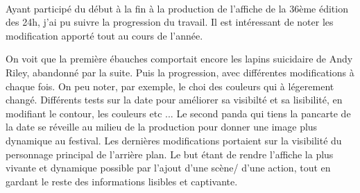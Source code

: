 \begin{center}
                \\
                Ayant participé du début à la fin à la production de l'affiche de la 36ème édition des 24h, j'ai pu suivre la progression du travail.
                Il est intéressant de noter les modification apporté tout au cours de l'année.
                
                On voit que la première ébauches comportait encore les lapins suicidaire de Andy Riley, abandonné par la suite. Puis la progression, avec différentes modifications à chaque fois.
                On peu noter, par exemple, le choi des couleurs qui à légerement changé.
                Différents tests sur la date pour améliorer sa visibilté et sa lisibilité, en modifiant le contour, les couleurs etc ...
                Le second panda qui tiens la pancarte de la date se réveille au milieu de la production pour donner une image plus dynamique au festival.
                Les dernières modifications portaient sur la visibilité du personnage principal de l'arrière plan.
                Le but étant de rendre l'affiche la plus vivante et dynamique possible par l'ajout d'une scène/ d'une action, tout en gardant le reste des informations lisibles et captivante.
            \end{center}
            
